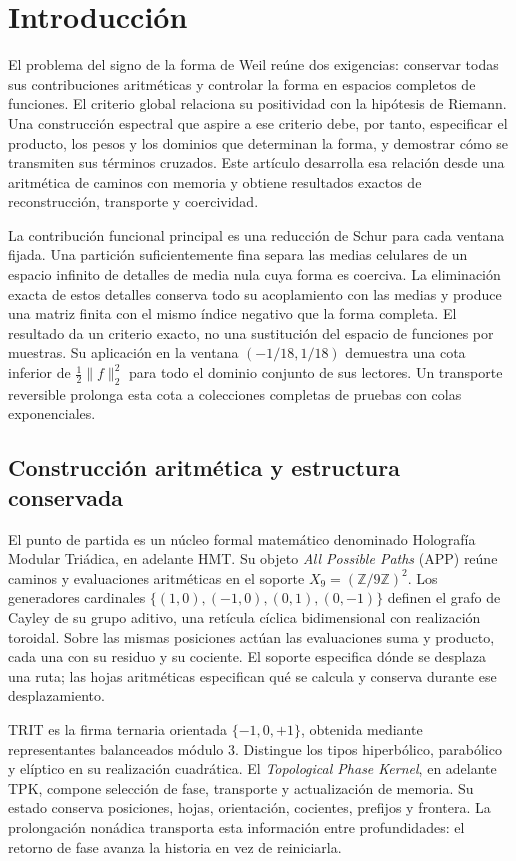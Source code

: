\section{Introducción}

El problema del signo de la forma de Weil reúne dos exigencias:
conservar todas sus contribuciones aritméticas y controlar la forma
en espacios completos de funciones. El criterio global relaciona
su positividad con la hipótesis de Riemann. Una construcción
espectral que aspire a ese criterio debe, por tanto, especificar
el producto, los pesos y los dominios que determinan la forma,
y demostrar cómo se transmiten sus términos cruzados. Este
artículo desarrolla esa relación desde una aritmética de caminos
con memoria y obtiene resultados exactos de reconstrucción,
transporte y coercividad.

La contribución funcional principal es una reducción de Schur
para cada ventana fijada. Una partición suficientemente fina
separa las medias celulares de un espacio infinito de detalles
de media nula cuya forma es coerciva. La eliminación exacta de
estos detalles conserva todo su acoplamiento con las medias y
produce una matriz finita con el mismo índice negativo que la
forma completa. El resultado da un criterio exacto, no una
sustitución del espacio de funciones por muestras. Su aplicación
en la ventana $(-1/18,1/18)$ demuestra una cota inferior de
$\frac12\|f\|_2^2$ para todo el dominio conjunto de sus lectores.
Un transporte reversible prolonga esta cota a colecciones completas
de pruebas con colas exponenciales.

\subsection*{Construcción aritmética y estructura conservada}

El punto de partida es un núcleo formal matemático denominado
Holografía Modular Triádica, en adelante HMT. Su objeto
\emph{All Possible Paths} (APP) reúne caminos y evaluaciones
aritméticas en el soporte $X_9=(\mathbb Z/9\mathbb Z)^2$.
Los generadores cardinales $\{(1,0),(-1,0),(0,1),(0,-1)\}$
definen el grafo de Cayley de su grupo aditivo, una retícula
cíclica bidimensional con realización toroidal. Sobre las mismas
posiciones actúan las evaluaciones suma y producto, cada una
con su residuo y su cociente. El soporte especifica dónde se
desplaza una ruta; las hojas aritméticas especifican qué se
calcula y conserva durante ese desplazamiento.

TRIT es la firma ternaria orientada $\{-1,0,+1\}$, obtenida
mediante representantes balanceados módulo $3$. Distingue los
tipos hiperbólico, parabólico y elíptico en su realización
cuadrática. El \emph{Topological Phase Kernel}, en adelante
TPK, compone selección de fase, transporte y actualización de
memoria. Su estado conserva posiciones, hojas, orientación,
cocientes, prefijos y frontera. La prolongación nonádica transporta
esta información entre profundidades: el retorno de fase avanza
la historia en vez de reiniciarla.

